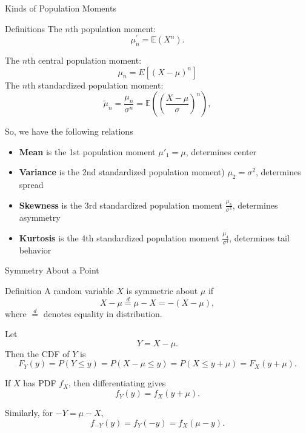 \begin{frame}{Kinds of Population Moments}
\begin{keybox}{Definitions}
The $n$th population moment:
\[
\mu^\prime_n = \mathbb{E}(X^n).
\]

The $n$th central population moment:
$$\mu_n = E\left[\left({X - \mu}\right)^n\right]$$
The $n$th standardized population moment:
\[
 \tilde{\mu}_n = \frac{\mu_n}{\sigma^n} = \mathbb{E}\left(
\left(
\frac{X-\mu}{\sigma}
\right)^n
\right),
\]
\end{keybox}
So, we have the following relations
\begin{itemize}
    \item \textbf{Mean} is the 1st population moment
$\mu'_1 = \mu$, determines center

\item \textbf{Variance} is the 2nd standardized population moment)
$\mu_2 = \sigma^2$,  determines  spread

\item \textbf{Skewness} is the 3rd standardized population moment
$\frac{\mu_3}{\sigma^3}$,  determines asymmetry

\item \textbf{Kurtosis} is the 4th standardized population moment
$\frac{\mu_4}{\sigma^4}$, determines tail behavior
\end{itemize}
\end{frame}


 
\begin{frame}{Symmetry About a Point}

\begin{keybox}{Definition}
A random variable $X$ is symmetric about $\mu$ if
\[
X-\mu \overset{d}{=} \mu-X=-(X-\mu),
\]
where $\overset{d}{=}$ denotes equality in distribution.
\end{keybox}

Let
\[
Y=X-\mu.
\]
Then the CDF of $Y$ is
\[
F_Y(y)
=
P(Y\le y)
=
P(X-\mu\le y)
=
P(X\le y+\mu)
=
F_X(y+\mu).
\]

If $X$ has PDF $f_X$, then differentiating gives
\[
f_Y(y)=f_X(y+\mu).
\]

Similarly, for $-Y=\mu-X$,
\[
f_{-Y}(y)=f_Y(-y)=f_X(\mu-y).
\]


\end{frame}
 

